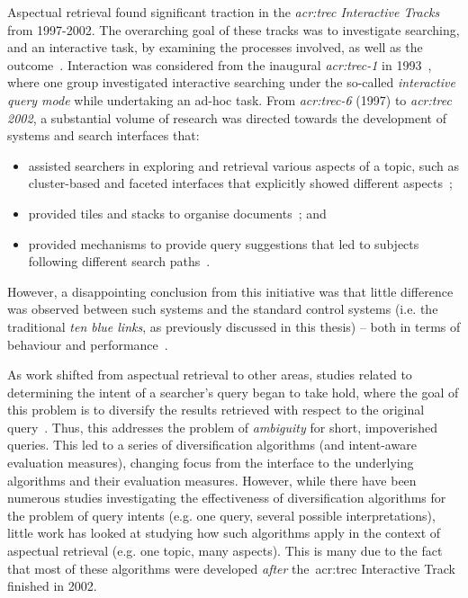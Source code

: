 Aspectual retrieval found significant traction in the \emph{\gls{acr:trec} Interactive Tracks}~\citep{over2001trec} from 1997-2002. The overarching goal of these tracks was to investigate searching, and an interactive task, by examining the processes involved, as well as the outcome~\citep{over2001trec}. Interaction was considered from the inaugural \emph{\gls{acr:trec}-1} in 1993~\citep{harman1993trec1}, where one group investigated interactive searching under the so-called \emph{interactive query mode} while undertaking an ad-hoc task. From \emph{\gls{acr:trec}-6} (1997) to \emph{\gls{acr:trec} 2002}, a substantial volume of research was directed towards the development of systems and search interfaces that:

\begin{itemize}
    \item{assisted searchers in exploring and retrieval various aspects of a topic, such as cluster-based and faceted interfaces that explicitly showed different aspects~\citep{mcdonald1998interactive, villa2009aspect_interface};}
    \item{provided tiles and stacks to organise documents~\citep{hearst1995tilebars, hearst1997texttiling, harper2006piling, iwata2012tilediversified}; and}
    \item{provided mechanisms to provide query suggestions that led to subjects following different search paths~\citep{kato2012query_suggestion, umemoto2016scentbar}.}
\end{itemize}

However, a disappointing conclusion from this initiative was that little difference was observed between such systems and the standard control systems (i.e. the traditional \emph{ten blue links}, as previously discussed in this thesis) -- both in terms of behaviour and performance~\citep{voorhees2005trec_book}.

As work shifted from aspectual retrieval to other areas, studies related to determining the intent of a searcher's query began to take hold, where the goal of this problem is to diversify the results retrieved with respect to the original query~\citep{rose2004understanding_user_goals}. Thus, this addresses the problem of \emph{ambiguity} for short, impoverished queries. This led to a series of diversification algorithms (and intent-aware evaluation measures), changing focus from the interface to the underlying algorithms and their evaluation measures. However, while there have been numerous studies investigating the effectiveness of diversification algorithms for the problem of query intents (e.g. one query, several possible interpretations), little work has looked at studying how such algorithms apply in the context of aspectual retrieval (e.g. one topic, many aspects). This is many due to the fact that most of these algorithms were developed \emph{after} the~\gls{acr:trec} Interactive Track finished in 2002.

